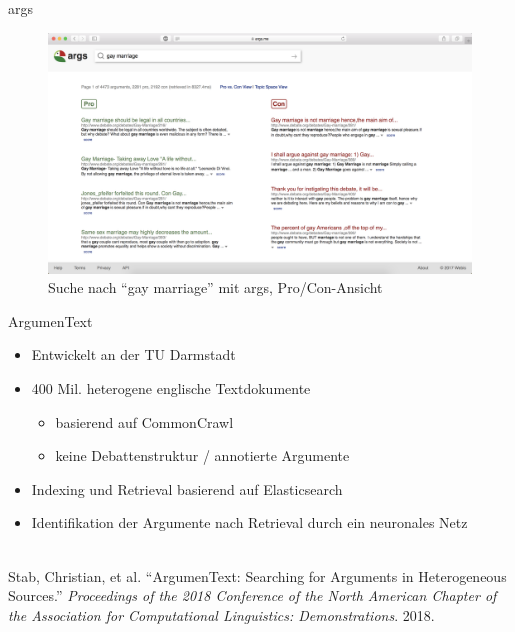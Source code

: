 \documentclass{beamer}
\begin{document}
	\begin{frame}{args}
		\begin{figure}
			\includegraphics[width=\textwidth]{img/args-screenshot-gay-marriage}
			\caption{Suche nach ``gay marriage'' mit args, Pro/Con-Ansicht}
		\end{figure}
	\end{frame}
	\begin{frame}{ArgumenText}
		\begin{itemize}
			\item Entwickelt an der TU Darmstadt
			\item 400 Mil. heterogene englische Textdokumente
			\begin{itemize}
				\item basierend auf CommonCrawl
				\item keine Debattenstruktur / annotierte Argumente
			\end{itemize}
			\item Indexing und Retrieval basierend auf Elasticsearch
			\item Identifikation der Argumente nach Retrieval durch ein neuronales Netz
		\end{itemize}
		~\\
		\tiny Stab, Christian, et al. ``ArgumenText: Searching for Arguments in Heterogeneous Sources.''
		\textit{Proceedings of the 2018 Conference of the North American Chapter of the Association for
		Computational Linguistics: Demonstrations}. 2018.
	\end{frame}
\end{document}
